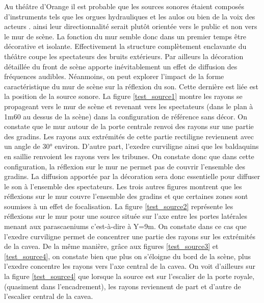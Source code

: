 Au théâtre d'Orange il est probable que les sources sonores étaient composés d'instruments tels que les orgues hydrauliques \cite[p.65]{rocconi} et les \gls{aulos} \cite[p.33]{rocconi} ou bien de la voix des acteurs \cite[]{voixRomain}.
ainsi leur directionnalité serait plutôt orientée vers le public et non vers le mur de scène. La fonction du mur semble donc dans un premier temps être décorative et isolante. Effectivement la structure complètement enclavante du théâtre coupe les spectateurs des bruits extérieurs. Par ailleurs la décoration détaillée du front de scène apporte inévitablement un effet de diffusion des  fréquences audibles. Néanmoins, on peut explorer l'impact de la forme caractéristique du mur de scène sur la réflexion du son. Cette dernière est liée est la position de la source sonore. La figure \ref{test_source1} montre les rayons se propageant vers le mur de scène et revenant vers les spectateurs (dans le plan à 1m60 au dessus de la scène) dans la configuration de référence sans décor. On constate que le mur autour de la porte centrale renvoi des rayons sur une partie des gradins. Les rayons aux extrémités de cette partie rectiligne reviennent avec un angle de 30° environ. D'autre part, l'\gls{exedre} curviligne ainsi que les baldaquins en saillie renvoient les rayons vers les tribunes. On constate donc que dans cette configuration, la réflexion sur le mur ne permet pas de couvrir l'ensemble des gradins. La diffusion apportée par la décoration sera donc essentielle pour diffuser le son à l'ensemble des spectateurs. Les trois autres figures montrent que les réflexions sur le mur couvre l'ensemble des gradins et que certaines zones sont soumises à un effet de focalisation. La figure \ref{test_source2} représente les réflexions sur le mur pour une source située sur l'axe entre les portes latérales menant aux \glspl{parascaenium} c'est-à-dire à Y=9m. On constate dans ce cas que l'\gls{exedre} curviligne permet de concentrer une partie des rayons sur les extrémités de la \gls{cavea}. De la même manière, grâce aux figures \ref{test_source3} et \ref{test_source4}, on constate bien que plus on s'éloigne du bord de la scène, plus l'\gls{exedre} concentre les rayons vers l'axe central de la \gls{cavea}. On voit d'ailleurs sur la figure \ref{test_source4} que lorsque la source est sur l'escalier de la porte royale, (quasiment dans l'encadrement), les rayons reviennent de part et d'autre de l'escalier central de la \gls{cavea}. 

